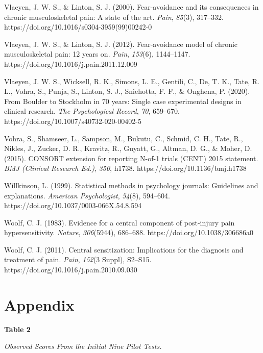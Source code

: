 \documentclass{article}
\begin{document}
Vlaeyen, J. W. S., \& Linton, S. J. (2000). Fear-avoidance and its consequences in chronic musculoskeletal pain: A state of the art. \emph{Pain}, \emph{85}(3), 317--332. https://doi.org/10.1016/s0304-3959(99)00242-0

Vlaeyen, J. W. S., \& Linton, S. J. (2012). Fear-avoidance model of chronic musculoskeletal pain: 12 years on. \emph{Pain}, \emph{153}(6), 1144--1147. https://doi.org/10.1016/j.pain.2011.12.009

Vlaeyen, J. W. S., Wicksell, R. K., Simons, L. E., Gentili, C., De, T. K., Tate, R. L., Vohra, S., Punja, S., Linton, S. J., Sniehotta, F. F., \& Onghena, P. (2020). From Boulder to Stockholm in 70 years: Single case experimental designs in clinical research. \emph{The Psychological Record}, \emph{70}, 659--670. https://doi.org/10.1007/s40732-020-00402-5

Vohra, S., Shamseer, L., Sampson, M., Bukutu, C., Schmid, C. H., Tate, R., Nikles, J., Zucker, D. R., Kravitz, R., Guyatt, G., Altman, D. G., \& Moher, D. (2015). CONSORT extension for reporting N-of-1 trials (CENT) 2015 statement. \emph{BMJ (Clinical Research Ed.)}, \emph{350}, h1738. https://doi.org/10.1136/bmj.h1738

Willkinson, L. (1999). Statistical methods in psychology journals: Guidelines and explanations. \emph{American Psychologist}, \emph{54}(8), 594--604. https://doi.org/10.1037/0003-066X.54.8.594

Woolf, C. J. (1983). Evidence for a central component of post-injury pain hypersensitivity. \emph{Nature}, \emph{306}(5944), 686--688. https://doi.org/10.1038/306686a0

Woolf, C. J. (2011). Central sensitization: Implications for the diagnosis and treatment of pain. \emph{Pain}, \emph{152}(3 Suppl), S2--S15. https://doi.org/10.1016/j.pain.2010.09.030





\section{Appendix}

\textbf{Table 2}

\emph{Observed Scores }\emph{From}\emph{ the Initial Nine Pilot Tests.}
\end{document}
